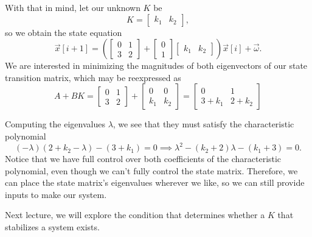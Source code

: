 \documentclass[letterpaper]{article}
\theoremstyle{remark}
\newcommand{\mat}[1]{\ensuremath{\begin{bmatrix}#1\end{bmatrix}}}
\begin{document}
With that in mind, let our unknown $K$ be
\[
    K = \mat{k_1 & k_2},
\]
so we obtain the state equation
\[
    \vec{x}[i + 1] = \left(\mat{ 0 & 1 \\ 3 & 2 } + \mat{0 \\ 1}\mat{k_1 & k_2}\right) \vec{x}[i] + \vec{\omega}.
\]
We are interested in minimizing the magnitudes of both eigenvectors of our state transition matrix, which may be reexpressed as
\[
    A + BK = \mat{0 & 1 \\ 3 & 2} + \mat{0 & 0 \\ k_1 & k_2} = \mat{0 & 1 \\ 3 + k_1 & 2 + k_2}
\]

Computing the eigenvalues $\lambda$, we see that they must satisfy the characteristic polynomial
\[
(-\lambda)(2 + k_2 - \lambda) - (3 + k_1) = 0 \implies \lambda^2 - (k_2 + 2)\lambda - (k_1+3) = 0.
\]
Notice that we have full control over both coefficients of the characteristic polynomial, even though we can't fully control the state matrix. Therefore, we can place the state matrix's eigenvalues wherever we like, so we can still provide inputs to make our system.

Next lecture, we will explore the condition that determines whether a $K$ that stabilizes a system exists.
\end{document}
